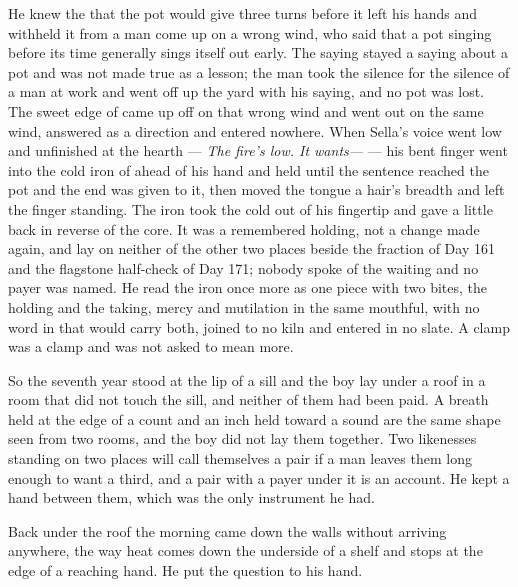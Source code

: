 He knew the  that the pot would give three turns before it left his hands and withheld it from a man come up on a wrong wind, who said that a pot singing before its time generally sings itself out early. The saying stayed a saying about a pot and was not made true as a lesson; the man took the silence for the silence of a man at work and went off up the yard with his saying, and no pot was lost. The sweet edge of  came up off  on that wrong wind and went out on the same wind, answered as a direction and entered nowhere. When Sella's voice went low and unfinished at the hearth --- \emph{The fire's low. It wants---} --- his bent finger went into the cold iron of  ahead of his hand and held until the sentence reached the pot and the end was given to it, then moved the tongue a hair's breadth and left the finger standing. The iron took the cold out of his fingertip and gave a little back in reverse of the core. It was a remembered holding, not a change made again, and lay on neither of the other two places beside the fraction of Day 161 and the flagstone half-check of Day 171; nobody spoke of the waiting and no payer was named. He read the iron once more as one piece with two bites, the holding and the taking, mercy and mutilation in the same mouthful, with no word in  that would carry both, joined to no kiln and entered in no slate. A clamp was a clamp and was not asked to mean more.

So the seventh year stood at the lip of a sill and the boy lay under a roof in a room that did not touch the sill, and neither of them had been paid. A breath held at the edge of a count and an inch held toward a sound are the same shape seen from two rooms, and the boy did not lay them together. Two likenesses standing on two places will call themselves a pair if a man leaves them long enough to want a third, and a pair with a payer under it is an account. He kept a hand between them, which was the only instrument he had.

\scenebreak

Back under the roof the morning came down the walls without arriving anywhere, the way heat comes down the underside of a shelf and stops at the edge of a reaching hand. He put the question to his hand.

